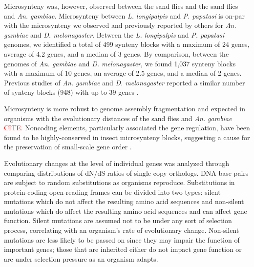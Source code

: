 
Microsynteny was, however, observed between the sand flies and the sand flies and \emph{An. gambiae}. Microsynteny between \emph{L. longipalpis} and \emph{P. papatasi} is on-par with the microsynteny we observed and previously reported by others for \emph{An. gambiae} and \emph{D. melonagaster}.  Between the \emph{L. longipalpis} and \emph{P. papatasi} genomes, we identified a total of 499 synteny blocks with a maximum of 24 genes, average of 4.2 genes, and a median of 3 genes. By comparison, between the genomes of \emph{An. gambiae} and \emph{D. melonagaster}, we found 1,037 synteny blocks with a maximum of 10 genes, an average of 2.5 genes, and a median of 2 genes. Previous studies of \emph{An. gambiae} and \emph{D. melonagaster} reported a similar number of synteny blocks (948) with up to 39 genes \cite{Zdobnov2002}.  

Microsynteny is more robust to genome assembly fragmentation \cite{Zdobnov2002} and expected in organisms with the evolutionary distances of the sand flies and \emph{An. gambiae} \textcolor{red}{CITE}. Noncoding elements, particularly associated the gene regulation, have been found to be highly-conserved in insect microsynteny blocks, suggesting a cause for the preservation of small-scale gene order \cite{Engstrom2007}.


Evolutionary changes at the level of individual genes was analyzed through comparing distributions of dN/dS ratios of single-copy orthologs. DNA base pairs are subject to random substitutions as organisms reproduce.  Substitutions in protein-coding open-reading frames can be divided into two types: silent mutations which do not affect the resulting amino acid sequences and non-silent mutations which do affect the resulting amino acid sequences and can affect gene function.  Silent mutations are assumed not to be under any sort of selection process, correlating with an organism's rate of evolutionary change.  Non-silent mutations are less likely to be passed on since they may impair the function of important genes; those that are inherited either do not impact gene function or are under selection pressure as an organism adapts.

